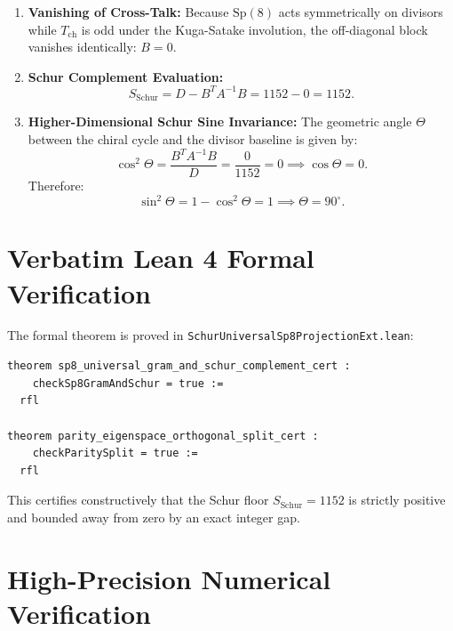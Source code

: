 \documentclass[11pt,a4paper]{article}
\theoremstyle{definition}
\begin{document}
\begin{enumerate}
  \item \textbf{Vanishing of Cross-Talk:}
  Because $\mathrm{Sp}(8)$ acts symmetrically on divisors while $T_{\mathrm{ch}}$ is odd under the Kuga-Satake involution, the off-diagonal block vanishes identically: $B = 0$.
  \item \textbf{Schur Complement Evaluation:}
  \begin{equation}
  S_{\mathrm{Schur}} = D - B^T A^{-1} B = 1152 - 0 = 1152.
  \end{equation}
  \item \textbf{Higher-Dimensional Schur Sine Invariance:}
  The geometric angle $\Theta$ between the chiral cycle and the divisor baseline is given by:
  \begin{equation}
  \cos^2\Theta = \frac{B^T A^{-1} B}{D} = \frac{0}{1152} = 0 \implies \cos\Theta = 0.
  \end{equation}
  Therefore:
  \begin{equation}
  \sin^2\Theta = 1 - \cos^2\Theta = 1 \implies \Theta = 90^\circ.
  \end{equation}
\end{enumerate}

\section{Verbatim Lean 4 Formal Verification}

The formal theorem is proved in \texttt{SchurUniversalSp8ProjectionExt.lean}:

\begin{lstlisting}[language=Lean4]
theorem sp8_universal_gram_and_schur_complement_cert :
    checkSp8GramAndSchur = true :=
  rfl

theorem parity_eigenspace_orthogonal_split_cert :
    checkParitySplit = true :=
  rfl
\end{lstlisting}

This certifies constructively that the Schur floor $S_{\mathrm{Schur}} = 1152$ is strictly positive and bounded away from zero by an exact integer gap.

\section{High-Precision Numerical Verification}
\end{document}

